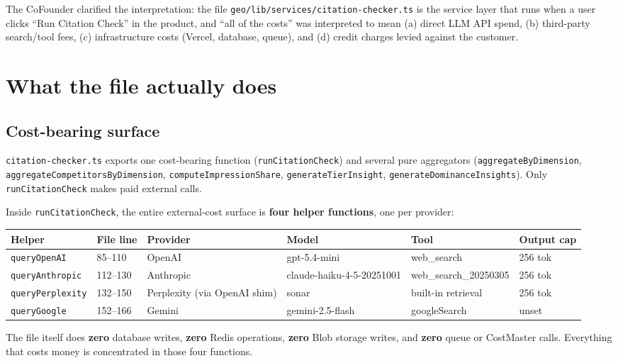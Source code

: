 \documentclass[11pt,letterpaper]{article}
\begin{document}
The CoFounder clarified the interpretation: the file
\texttt{geo/lib/services/citation-checker.ts} is the service layer that runs
when a user clicks ``Run Citation Check'' in the product, and ``all of the
costs'' was interpreted to mean (a) direct LLM API spend, (b) third-party
search/tool fees, (c) infrastructure costs (Vercel, database, queue), and
(d) credit charges levied against the customer.

\section{What the file actually does}

\subsection{Cost-bearing surface}

\texttt{citation-checker.ts} exports one cost-bearing function
(\texttt{runCitationCheck}) and several pure aggregators
(\texttt{aggregateByDimension}, \texttt{aggregateCompetitorsByDimension},
\texttt{computeImpressionShare}, \texttt{generateTierInsight},
\texttt{generateDominanceInsights}). Only \texttt{runCitationCheck} makes
paid external calls.

Inside \texttt{runCitationCheck}, the entire external-cost surface is
\textbf{four helper functions}, one per provider:

\begin{center}
\begin{tabular}{@{}llllll@{}}
\toprule
\textbf{Helper} & \textbf{File line} & \textbf{Provider} & \textbf{Model} & \textbf{Tool} & \textbf{Output cap} \\
\midrule
\texttt{queryOpenAI}     & 85--110  & OpenAI    & gpt-5.4-mini               & web\_search          & 256 tok \\
\texttt{queryAnthropic}  & 112--130 & Anthropic & claude-haiku-4-5-20251001  & web\_search\_20250305 & 256 tok \\
\texttt{queryPerplexity} & 132--150 & Perplexity (via OpenAI shim) & sonar    & built-in retrieval   & 256 tok \\
\texttt{queryGoogle}     & 152--166 & Gemini    & gemini-2.5-flash           & googleSearch         & unset \\
\bottomrule
\end{tabular}
\end{center}

The file itself does \textbf{zero} database writes, \textbf{zero} Redis
operations, \textbf{zero} Blob storage writes, and \textbf{zero} queue or
CostMaster calls. Everything that costs money is concentrated in those four
functions.
\end{document}
